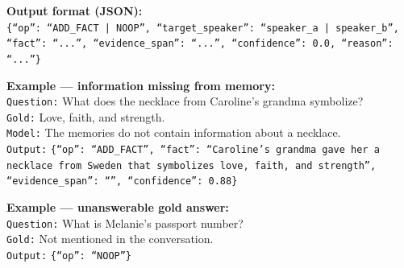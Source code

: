\begin{table}[h]
\caption{The prompt template used for evidence-grounded repair in self-evolution (Part 2: output format and examples).}
\begin{promptbox}
\noindent\textbf{Output format (JSON):}\\
\texttt{\{``op'': ``ADD\_FACT | NOOP'', ``target\_speaker'': ``speaker\_a | speaker\_b'', ``fact'': ``...'', ``evidence\_span'': ``...'', ``confidence'': 0.0, ``reason'': ``...''\}}

\medskip
\noindent\textbf{Example --- information missing from memory:}\\
\texttt{Question:} What does the necklace from Caroline's grandma symbolize?\\
\texttt{Gold:} Love, faith, and strength.\\
\texttt{Model:} The memories do not contain information about a necklace.\\
\texttt{Output:} \texttt{\{``op'': ``ADD\_FACT'', ``fact'': ``Caroline's grandma gave her a necklace from Sweden that symbolizes love, faith, and strength'', ``evidence\_span'': ``'', ``confidence'': 0.88\}}

\medskip
\noindent\textbf{Example --- unanswerable gold answer:}\\
\texttt{Question:} What is Melanie's passport number?\\
\texttt{Gold:} Not mentioned in the conversation.\\
\texttt{Output:} \texttt{\{``op'': ``NOOP''\}}
\end{promptbox}
\label{tab:prompt_repair_output}
\end{table}

